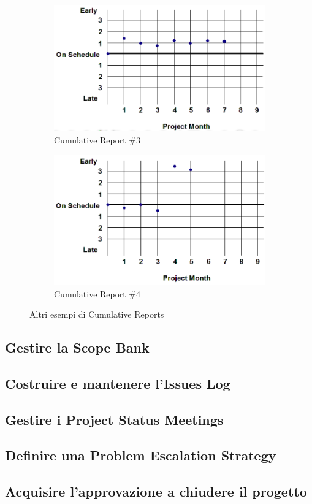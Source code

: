 \begin{figure}[H]
	\centering
	\begin{subfigure}[b]{0.45\textwidth}
		\centering
		\includegraphics[width=\textwidth]{document/img/cumreport3.png}
		\caption{Cumulative Report \#3}
		\label{cumreport3}
	\end{subfigure}
	\hfill
	\begin{subfigure}[b]{0.45\textwidth}
		\centering
		\includegraphics[width=\textwidth]{document/img/cumreport4.png}
		\caption{Cumulative Report \#4}
		\label{cumreport4}
	\end{subfigure}
	\caption{Altri esempi di Cumulative Reports}
\end{figure}

\subsection{Gestire la Scope Bank}
\subsection{Costruire e mantenere l’Issues Log}
\subsection{Gestire i Project Status Meetings}
\subsection{Definire una Problem Escalation Strategy}
\subsection{Acquisire l’approvazione a chiudere il progetto}
